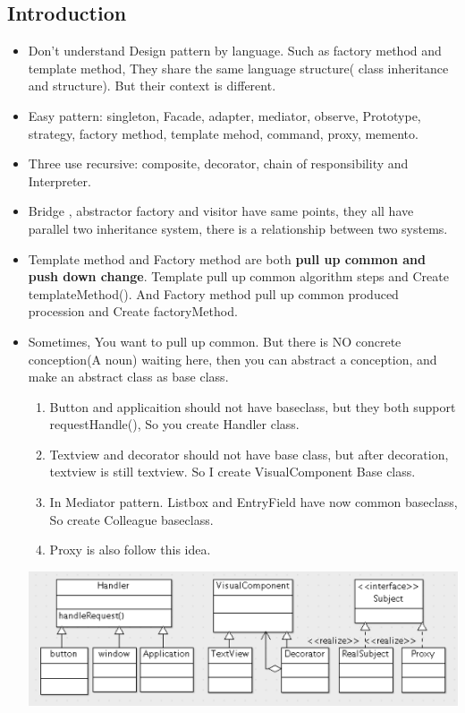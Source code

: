 \documentclass[a4paper,12pt,twoside]{book}
\begin{document}
\subsection{Introduction}
\begin{itemize}

\item Don't understand Design pattern by language. Such as factory method and template method, They share the same language structure( class inheritance and structure). But their context is different. 

\item Easy pattern: singleton, Facade, adapter, mediator,  observe, Prototype, strategy, factory method, template mehod, command, proxy, memento. 

\item Three use recursive: composite, decorator, chain of responsibility and Interpreter. 

\item Bridge , abstractor factory and visitor have same points, they all  have parallel two inheritance system, there is a relationship between two systems. 

\item Template method and Factory method are both \textbf{pull up common and push down change}. Template pull up common algorithm steps and Create templateMethod(). And Factory method pull up common produced procession and Create factoryMethod.

\item Sometimes, You want to pull up common. But there is NO concrete conception(A noun) waiting here, then you can abstract a conception, and make an abstract class as base class. 
\begin{enumerate}
\item Button and applicaition should not have baseclass, but they both support requestHandle(), So you create Handler class.
\item Textview and decorator should not have base class, but after decoration, textview is still textview.  So I create VisualComponent Base class.
\item In Mediator pattern. Listbox and EntryField have now common baseclass, So create Colleague baseclass. 
\item  Proxy is also follow this idea.
\end{enumerate}
   
\includegraphics[scale=0.6]{pics/common.png}


\end{itemize}
\end{document}
